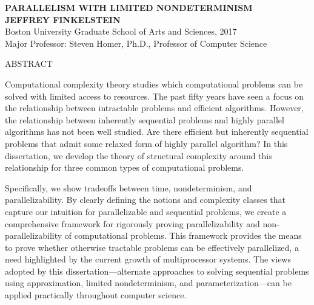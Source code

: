\newenvironment{abstractpage}
  {\thispagestyle{plain}}
  {}

\begin{abstractpage}
  \begin{center}
    \textbf{\uppercase{Parallelism with limited nondeterminism}}\\
    \textbf{\uppercase{Jeffrey Finkelstein}}\\
    Boston University Graduate School of Arts and Sciences, 2017\\
    Major Professor: Steven Homer, Ph.D., Professor of Computer Science
  \end{center}
  \begin{center}
    ABSTRACT
  \end{center}
  Computational complexity theory studies which computational problems can be solved with limited access to resources.
  The past fifty years have seen a focus on the relationship between intractable problems and efficient algorithms.
  However, the relationship between inherently sequential problems and highly parallel algorithms has not been well studied.
  Are there efficient but inherently sequential problems that admit some relaxed form of highly parallel algorithm?
  In this dissertation, we develop the theory of structural complexity around this relationship for three common types of computational problems.

  Specifically, we show tradeoffs between time, nondeterminism, and parallelizability.
  By clearly defining the notions and complexity classes that capture our intuition for parallelizable and sequential problems, we create a comprehensive framework for rigorously proving parallelizability and non-parallelizability of computational problems.
  This framework provides the means to prove whether otherwise tractable problems can be effectively parallelized, a need highlighted by the current growth of multiprocessor systems.
  The views adopted by this dissertation---alternate approaches to solving sequential problems using approximation, limited nondeterminism, and parameterization---can be applied practically throughout computer science.
\end{abstractpage}
